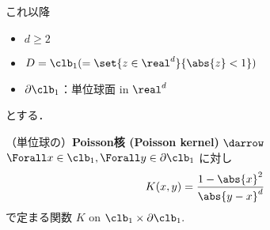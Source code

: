 \documentclass{jsarticle}
\begin{document}
これ以降
\begin{itemize}
    \item $d\ge2$
    \item $D=\clb_1(=\set{z\in\real^d}{\abs{z}<1})$
    \item $\partial \clb_1$：単位球面 in $\real^d$
\end{itemize}
とする．

\begin{shadebox}
    \setcounter{thm}{9}
    \begin{df}\label{thm:710}
        （単位球の）\textbf{Poisson核 (Poisson kernel)}
        $\darrow$
        $\Forall x\in\clb_1, \Forall y\in\partial\clb_1$ に対し
        $$
        K(x, y)
        = \frac{1-\abs{x}^2}{\abs{y-x}^d}
        $$
        で定まる関数 $K$ on $\clb_1\times\partial\clb_1.$
    \end{df}
\end{shadebox}
\end{document}
